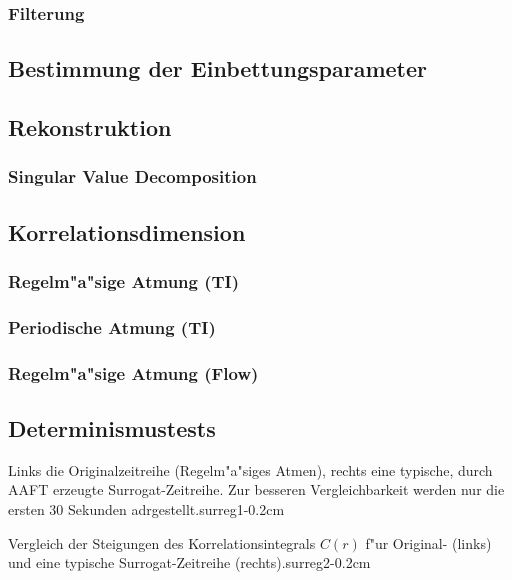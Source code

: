 \subsubsection{Filterung}

\subsection{Bestimmung der Einbettungsparameter}

\subsection{Rekonstruktion}

\subsubsection{Singular Value Decomposition}

\subsection{Korrelationsdimension}

\subsubsection{Regelm"a"sige Atmung (TI)}

\subsubsection{Periodische Atmung (TI)}

\subsubsection{Regelm"a"sige Atmung (Flow)}

\subsection{Determinismustests}

{Links die Originalzeitreihe (Regelm"a"siges Atmen), rechts eine typische, durch AAFT
erzeugte Surrogat-Zeitreihe. Zur besseren Vergleichbarkeit  werden nur die ersten 30
Sekunden adrgestellt.}{surreg1}{-0.2cm}

{Vergleich der Steigungen des Korrelationsintegrals $C(r)$ f"ur Original- (links) und eine
typische Surrogat-Zeitreihe (rechts).}{surreg2}{-0.2cm}

